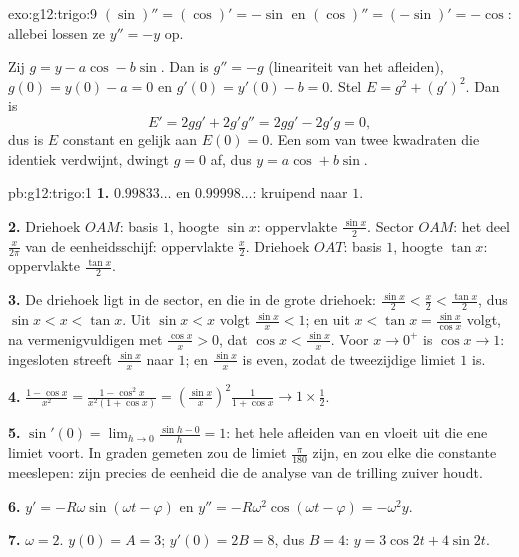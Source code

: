 \begin{solution}{exo:g12:trigo:9}
$(\sin)'' = (\cos)' = -\sin$ en $(\cos)'' = (-\sin)' = -\cos$: allebei
lossen ze $y'' = -y$ op.

Zij $g = y - a\cos - b\sin$. Dan is $g'' = -g$ (lineariteit van het
afleiden), $g(0) = y(0) - a = 0$ en $g'(0) = y'(0) - b = 0$. Stel
$E = g^2 + (g')^2$. Dan is
\[
E' = 2g g' + 2g' g'' = 2g g' - 2g' g = 0,
\]
dus is $E$ constant en gelijk aan $E(0) = 0$. Een som van twee kwadraten die
identiek verdwijnt, dwingt $g = 0$ af, dus $y = a\cos + b\sin$.
\end{solution}

\begin{solution}{pb:g12:trigo:1}
\textbf{1.} $0.99833\ldots$ en $0.99998\ldots$: kruipend naar $1$.

\textbf{2.} Driehoek $OAM$: basis $1$, hoogte $\sin x$: oppervlakte
$\frac{\sin x}{2}$. Sector $OAM$: het deel $\frac{x}{2\pi}$ van de
eenheidsschijf: oppervlakte $\frac x2$. Driehoek $OAT$: basis $1$, hoogte
$\tan x$: oppervlakte $\frac{\tan x}{2}$.

\textbf{3.} De driehoek ligt in de sector, en die in de grote driehoek:
$\frac{\sin x}{2} < \frac x2 < \frac{\tan x}{2}$, dus
$\sin x < x < \tan x$. Uit $\sin x < x$ volgt $\frac{\sin x}{x} < 1$; en uit
$x < \tan x = \frac{\sin x}{\cos x}$ volgt, na vermenigvuldigen met
$\frac{\cos x}{x} > 0$, dat $\cos x < \frac{\sin x}{x}$. Voor $x \to 0^+$ is
$\cos x \to 1$: ingesloten streeft $\frac{\sin x}{x}$ naar $1$; en
$\frac{\sin x}{x}$ is even, zodat de tweezijdige limiet $1$ is.

\textbf{4.} $\frac{1 - \cos x}{x^2} = \frac{1 - \cos^2 x}{x^2 (1 + \cos x)} =
\left(\frac{\sin x}{x}\right)^2 \frac{1}{1 + \cos x} \to 1 \times \frac12$.

\textbf{5.} $\sin'(0) = \lim_{h \to 0} \frac{\sin h - 0}{h} = 1$: het hele
afleiden van  en  vloeit uit die ene limiet voort. In graden
gemeten zou de limiet $\frac{\pi}{180}$ zijn, en zou elke  die
constante meeslepen:  zijn precies de eenheid die de analyse van de
trilling zuiver houdt.

\textbf{6.} $y' = -R\omega\sin(\omega t - \varphi)$ en
$y'' = -R\omega^2\cos(\omega t - \varphi) = -\omega^2 y$.

\textbf{7.} $\omega = 2$. $y(0) = A = 3$; $y'(0) = 2B = 8$, dus $B = 4$:
$y = 3\cos 2t + 4\sin 2t$.


\end{solution}
